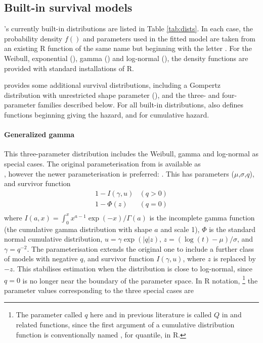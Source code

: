 \documentclass[nojss,nofooter]{jss}
\begin{document}
\subsection{Built-in survival models}

's currently built-in distributions are listed in Table
\ref{tab:dists}.  In each case, the probability density $f()$ and
parameters used in the fitted model are taken from an existing R
function of the same name but beginning with the letter .  For
the Weibull, exponential (), gamma () and
log-normal (), the density functions are provided with
standard installations of R.  

 provides some additional survival distributions,
including a Gompertz distribution with unrestricted shape parameter
(), and the three- and four-parameter families
described below.  For all built-in distributions,  also
defines functions beginning  giving the hazard, and 
for cumulative hazard.

\paragraph{Generalized gamma} This three-parameter distribution
includes the Weibull, gamma and log-normal as special cases.  The
original parameterisation from \citet{stacy:gengamma} is available as\\
, however the newer parameterisation
\citep{prentice:loggamma} is preferred: .  This has
parameters ($\mu$,$\sigma$,$q$), and survivor function
\[
\begin{array}{ll}
1 - I(\gamma,u)   & (q > 0)\\
1 - \Phi(z)  & (q = 0)\\
\end{array}
\]
where $I(a,x) = \int_0^x x^{a-1}\exp(-x)/\Gamma(a)$ is the incomplete gamma function (the cumulative gamma distribution with shape $a$ and scale 1), $\Phi$ is the standard normal cumulative distribution,  $u = \gamma \exp(|q|z)$, $z=(\log(t) - \mu)/\sigma$, and $\gamma=q^{-2}$.   The \citet{prentice:loggamma} parameterisation extends the original one to include a further class of models with negative $q$, and survivor function $I(\gamma,u)$, where $z$ is replaced by $-z$.   This stabilises estimation when the distribution is close to log-normal, since $q=0$ is no longer near the boundary of the parameter space.    In R notation, \footnote{The parameter called $q$ here and in previous literature is called $Q$ in  and related functions, since the first argument of a cumulative distribution function is conventionally named , for quantile, in R.} the parameter values corresponding to the three special cases are
\end{document}
